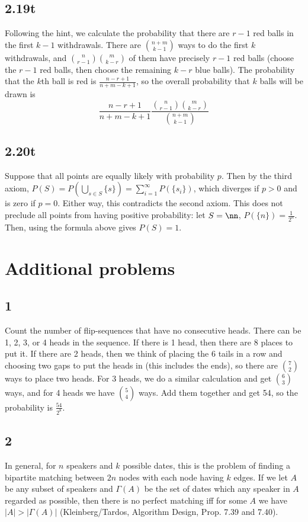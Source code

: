 \documentclass{article}
\begin{document}
\subsection*{2.19t}
Following the hint, we calculate the probability that there are $r-1$ red balls in the first $k-1$ withdrawals. There are $\binom{n+m}{k-1}$ ways to do the first $k$ withdrawals, and $\binom{n}{r-1}\binom{m}{k-r}$ of them have precisely $r-1$ red balls (choose the $r-1$ red balls, then choose the remaining $k-r$ blue balls). The probability that the $k$th ball is red is $\frac{n-r+1}{n+m-k+1}$, so the overall probability that $k$ balls will be drawn is 
$$\frac{n-r+1}{n+m-k+1}\frac{\binom{n}{r-1}\binom{m}{k-r}}{\binom{n+m}{k-1}}$$
\subsection*{2.20t}
Suppose that all points are equally likely with probability $p$. Then by the third axiom, $P(S)=P(\bigcup_{s\in S}\{s\})=\sum_{i=1}^\infty P(\{s_i\})$, which diverges if $p>0$ and is zero if $p=0$. Either way, this contradicts the second axiom. This does not preclude all points from having positive probability: let $S=\nn$, $P(\{n\})=\frac{1}{2^n}$. Then, using the formula above gives $P(S)=1$.

\section*{Additional problems}
\subsection*{1}
Count the number of flip-sequences that have no consecutive heads. There can be 1, 2, 3, or 4 heads in the sequence. If there is 1 head, then there are 8 places to put it. If there are 2 heads, then we think of placing the 6 tails in a row and choosing two gaps to put the heads in (this includes the ends), so there are $\binom{7}{2}$ ways to place two heads. For 3 heads, we do a similar calculation and get $\binom{6}{3}$ ways, and for 4 heads we have $\binom{5}{4}$ ways. Add them together and get 54, so the probability is $\frac{54}{2^8}$.
\subsection*{2}
In general, for $n$ speakers and $k$ possible dates, this is the problem of finding a bipartite matching between $2n$ nodes with each node having $k$ edges. If we let $A$ be any subset of speakers and $\Gamma(A)$ be the set of dates which any speaker in $A$ regarded as possible, then there is no perfect matching iff for some $A$ we have $|A|>|\Gamma(A)|$ (Kleinberg/Tardos, Algorithm Design, Prop. 7.39 and 7.40). 
\end{document}
